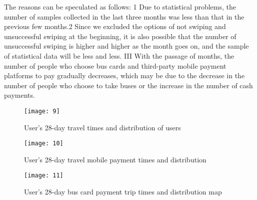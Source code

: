 \documentclass[../mcmpaper]{subfiles}
\begin{document}
\begin{enumerate}[label=\arabic*., format=\bfseries, itemindent=0pt, leftmargin=0pt, topsep=0pt, listparindent=\parindent, itemsep=1pt]
\par
The reasons can be speculated as follows: 1 Due to statistical problems, the number of samples collected in the last three months was less than that in the previous few months.2 Since we excluded the options of not swiping and unsuccessful swiping at the beginning, it is also possible that the number of unsuccessful swiping is higher and higher as the month goes on, and the sample of statistical data will be less and less. III With the passage of months, the number of people who choose bus cards and third-party mobile payment platforms to pay gradually decreases, which may be due to the decrease in the number of people who choose to take buses or the increase in the number of cash payments.
\begin{figure}[!ht]
\centering
\begin{minipage}[c]{0.45\linewidth}
    \centering
    \texttt{[image: 9]}
    \caption{User's 28-day travel times and distribution of users}
    \label{fig:5.5}
\end{minipage}
\qquad
\begin{minipage}[c]{0.45\linewidth}
    \centering
    \texttt{[image: 10]}
    \caption{User's 28-day travel mobile payment times and distribution}
    \label{fig:5.6}
    \end{minipage}
\begin{minipage}[c]{1\linewidth}
    \centering
    \texttt{[image: 11]}
    \caption{User's 28-day bus card payment trip times and distribution map}
    \label{fig:5.7}
\end{minipage}
\end{figure}

\end{enumerate}
\end{document}
